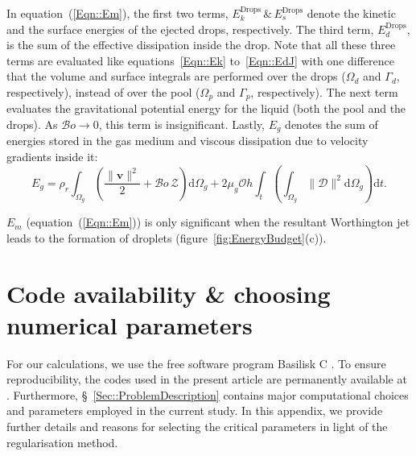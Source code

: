 \documentclass[final]{jfm}
\begin{document}
 In equation~(\ref{Eqn::Em}), the first two terms, $E_k^\text{Drops}\,\&\,E_s^\text{Drops}$ denote the kinetic and the surface energies of the ejected drops, respectively. The third term, $E_d^\text{Drops}$, is the sum of the effective dissipation inside the drop. Note that all these three terms are evaluated like equations~\ref{Eqn::Ek} to~\ref{Eqn::EdJ} with one difference that the volume and surface integrals are performed over the drops ($\Omega_d$ and $\Gamma_d$, respectively), instead of over the pool ($\Omega_p$ and $\Gamma_p$, respectively). The next term evaluates the gravitational potential energy for the liquid (both the pool and the drops). As $\mathcal{B}o \to 0$, this term is insignificant. Lastly, $E_g$ denotes the sum of energies stored in the gas medium and viscous dissipation due to velocity gradients inside it:
\begin{equation}\label{Eqn::Eg}
	E_g = \rho_r\int_{\Omega_g}\left(\frac{\|\boldsymbol{v}\|^2}{2} + \mathcal{B}o\,\mathcal{Z}\right)\mathrm{d}\Omega_g + 2\mu_g\mathcal{O}h\int_t\left(\int_{\Omega_g}\|\boldsymbol{\mathcal{D}}\|^2\mathrm{d}\Omega_g\right)\mathrm{d}t.
\end{equation}

\noindent$E_m$ (equation~(\ref{Eqn::Em})) is only significant when the resultant Worthington jet leads to the formation of droplets (figure~\ref{fig:EnergyBudget}(c)). 

\section{Code availability \& choosing numerical parameters}\label{App::codes}
For our calculations, we use the free software program Basilisk C \citep{basiliskPopinet, popinet2015quadtree}. To ensure reproducibility, the codes used in the present article are permanently available at \citet{basiliskVatsal}. Furthermore, \S~\ref{Sec::ProblemDescription} contains major computational choices and parameters employed in the current study. In this appendix, we provide further details and reasons for selecting the critical parameters in light of the regularisation method. 
\end{document}
